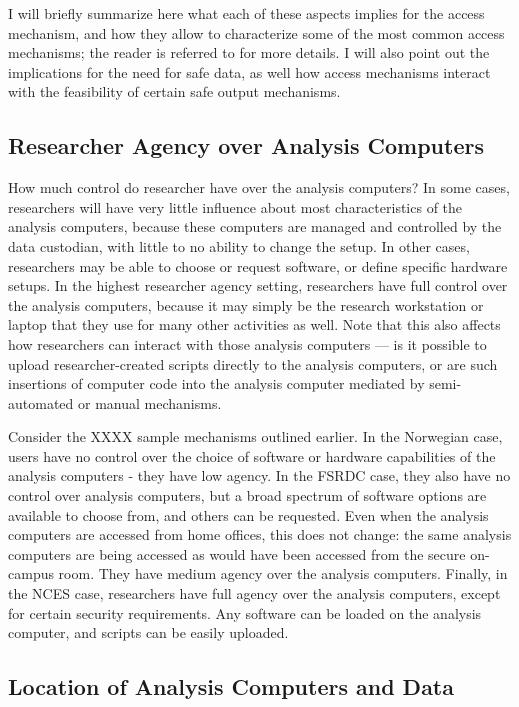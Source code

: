 I will briefly summarize here what each of these aspects implies for the access mechanism, and how they allow to characterize some of the most common access mechanisms; the reader is referred to \cite{shen_physically_2021} for more details. I will also point out the implications for the need for safe data, as well how access mechanisms interact with the feasibility of certain safe output mechanisms.


\subsection{Researcher Agency over Analysis Computers}

How much control do researcher have over the analysis computers? In some cases, researchers will have very little influence about most characteristics of the analysis computers, because these computers are managed and controlled by the data custodian, with little to no ability to change the setup. In other cases, researchers may be able to choose or request software, or define specific hardware setups. In the highest researcher agency setting, researchers have full control over the analysis computers, because it may simply be the research workstation or laptop that they use for many other activities as well. Note that this also affects how researchers can interact with those analysis computers --- is it possible to upload researcher-created scripts directly to the analysis computers, or are such insertions of computer code into the analysis computer mediated by semi-automated or manual mechanisms. 

Consider the XXXX sample mechanisms outlined earlier. In the Norwegian case, users have no control over the choice of software or hardware capabilities of the analysis computers - they have low agency. In the FSRDC case, they also have no control over analysis computers, but a broad spectrum of software options are available to choose from, and others can be requested. Even when the analysis computers are accessed from home offices, this does not change: the same analysis computers are being accessed as would have been accessed from the secure on-campus room. They have medium agency over the analysis computers. Finally, in the NCES case, researchers have full agency over the analysis computers, except for certain security requirements. Any software can be loaded on the analysis computer, and scripts can be easily uploaded.

\subsection{Location of Analysis Computers and Data}

